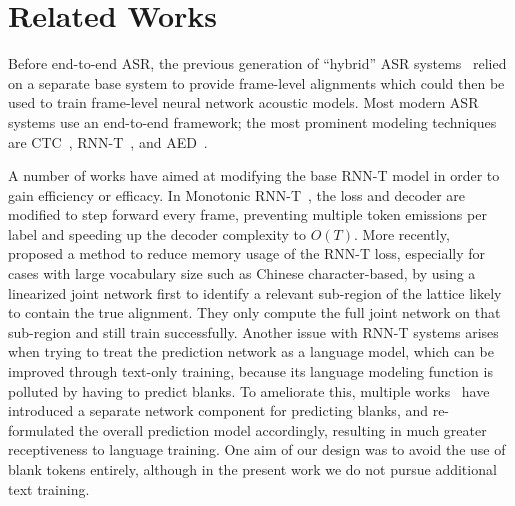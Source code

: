 \section{Related Works}
\label{related}




Before end-to-end ASR, the previous generation of ``hybrid'' ASR systems~\citep{bourlard1996hybrid} relied on a separate base system to provide frame-level alignments which could then be used to train frame-level neural network acoustic models.  Most modern ASR systems use an end-to-end framework; the most prominent modeling techniques are CTC~\citep{graves2006connectionist}, RNN-T~\citep{graves2012sequence}, and AED~\citep{chorowski2015attention-based,chan2015listen}.

A number of works have aimed at modifying the base RNN-T model in order to gain efficiency or efficacy.  In Monotonic RNN-T~\citep{monotonicrnnt}, the loss and decoder are modified to step forward every frame, preventing multiple token emissions per label and speeding up the decoder complexity to $O(T)$.  More recently, ~\citep{kuang2022pruned} proposed a method to reduce memory usage of the RNN-T loss, especially for cases with large vocabulary size such as Chinese character-based, by using a linearized joint network first to identify a relevant sub-region of the lattice likely to contain the true alignment.  They only compute the full joint network on that sub-region and still train successfully.  Another issue with RNN-T systems arises when trying to treat the prediction network as a language model, which can be improved through text-only training, because its language modeling function is polluted by having to predict blanks.  To ameliorate this, multiple works~\citep{variani2020hybrid,chen2022factorized,meng2023modular} have introduced a separate network component for predicting blanks, and re-formulated the overall prediction model accordingly, resulting in much greater receptiveness to language training.  One aim of our design was to avoid the use of blank tokens entirely, although in the present work we do not pursue additional text training.  

